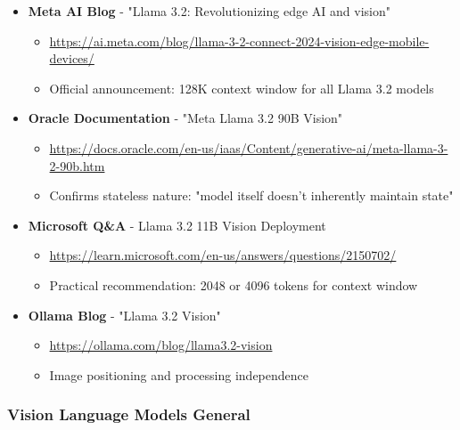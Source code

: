 \documentclass[11pt,a4paper]{article}
\begin{document}
\begin{itemize}[leftmargin=*]
    \item \textbf{Meta AI Blog} - "Llama 3.2: Revolutionizing edge AI and vision"
    \begin{itemize}
        \item \url{https://ai.meta.com/blog/llama-3-2-connect-2024-vision-edge-mobile-devices/}
        \item Official announcement: 128K context window for all Llama 3.2 models
    \end{itemize}

    \item \textbf{Oracle Documentation} - "Meta Llama 3.2 90B Vision"
    \begin{itemize}
        \item \url{https://docs.oracle.com/en-us/iaas/Content/generative-ai/meta-llama-3-2-90b.htm}
        \item Confirms stateless nature: "model itself doesn't inherently maintain state"
    \end{itemize}

    \item \textbf{Microsoft Q\&A} - Llama 3.2 11B Vision Deployment
    \begin{itemize}
        \item \url{https://learn.microsoft.com/en-us/answers/questions/2150702/}
        \item Practical recommendation: 2048 or 4096 tokens for context window
    \end{itemize}

    \item \textbf{Ollama Blog} - "Llama 3.2 Vision"
    \begin{itemize}
        \item \url{https://ollama.com/blog/llama3.2-vision}
        \item Image positioning and processing independence
    \end{itemize}
\end{itemize}

\subsubsection{Vision Language Models General}
\end{document}

